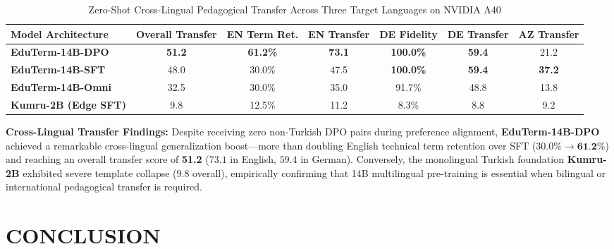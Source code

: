 \documentclass[a4paper,12pt]{report}
\begin{document}
\begin{table}[htbp]
\centering
\small
\caption{Zero-Shot Cross-Lingual Pedagogical Transfer Across Three Target Languages on NVIDIA A40}
\label{tab:cross_lingual_transfer}
\scriptsize\setlength{\tabcolsep}{1.5pt}
\begin{tabularx}{\textwidth}{>{\RaggedRight\arraybackslash}Xcccccc}
\hline
\textbf{Model Architecture} & \textbf{Overall Transfer} & \textbf{EN Term Ret.} & \textbf{EN Transfer} & \textbf{DE Fidelity} & \textbf{DE Transfer} & \textbf{AZ Transfer} \\
\hline
\textbf{EduTerm-14B-DPO} & \textbf{51.2} & \textbf{61.2\%} & \textbf{73.1} & \textbf{100.0\%} & \textbf{59.4} & 21.2 \\
\textbf{EduTerm-14B-SFT} & 48.0 & 30.0\% & 47.5 & \textbf{100.0\%} & \textbf{59.4} & \textbf{37.2} \\
\textbf{EduTerm-14B-Omni} & 32.5 & 30.0\% & 35.0 & 91.7\% & 48.8 & 13.8 \\
\textbf{Kumru-2B (Edge SFT)} & 9.8 & 12.5\% & 11.2 & 8.3\% & 8.8 & 9.2 \\
\hline
\end{tabularx}
\end{table}

\textbf{Cross-Lingual Transfer Findings:} Despite receiving zero non-Turkish DPO pairs during preference alignment, \textbf{EduTerm-14B-DPO} achieved a remarkable cross-lingual generalization boost---more than doubling English technical term retention over SFT ($30.0\% \to \textbf{61.2\%}$) and reaching an overall transfer score of \textbf{51.2} ($73.1$ in English, $59.4$ in German). Conversely, the monolingual Turkish foundation \textbf{Kumru-2B} exhibited severe template collapse ($9.8$ overall), empirically confirming that 14B multilingual pre-training is essential when bilingual or international pedagogical transfer is required.


\chapter{CONCLUSION}
\end{document}
